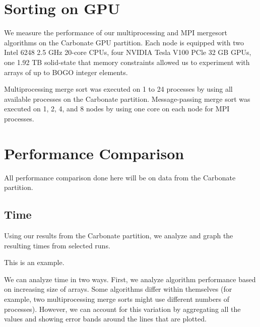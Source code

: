 \section{Sorting on GPU}

We measure the performance of our multiprocessing and MPI mergesort algorithms on the Carbonate GPU partition. Each node
is equipped with two Intel 6248 2.5 GHz 20-core CPUs, four NVIDIA Tesla V100 PCle 32 GB GPUs, one 1.92 TB solid-state
that memory constraints allowed us to experiment with arrays of up to BOGO integer elements.

Multiprocessing merge sort was executed on 1 to 24 processes by using all available processes on the Carbonate partition. Message-passing merge sort was executed on 1, 2, 4, and 8 nodes by using one core on each node for MPI processes. 

\section{Performance Comparison}

All performance comparison done here will be on data from the Carbonate partition. 

\subsection{Time}

Using our results from the Carbonate partition, we analyze and graph the resulting times from selected runs. 

\begin{table}
    \caption{This is an example.}
    \label{tab:times-sort}
    \centering
\end{table}

We can analyze time in two ways. First, we analyze algorithm performance based on increasing size of arrays. Some algorithms differ within themselves (for example, two multiprocessing merge sorts might use different numbers of processes). However, we can account for this variation by aggregating all the values and showing error bands around the lines that are plotted. 

